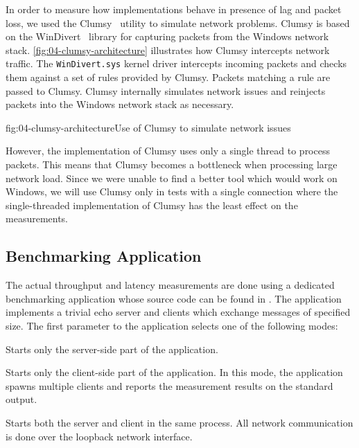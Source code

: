 In order to measure how implementations behave in presence of lag and packet loss, we used the
Clumsy~\cite{clumsy} utility to simulate network problems. Clumsy is based on the
WinDivert~\cite{WinDivert} library for capturing packets from the Windows network stack.
\autoref{fig:04-clumsy-architecture} illustrates how Clumsy intercepts network traffic. The
\texttt{WinDivert.sys} kernel driver intercepts incoming packets and checks them against a set of
rules provided by Clumsy. Packets matching a rule are passed to Clumsy. Clumsy internally simulates
network issues and reinjects packets into the Windows network stack as necessary.

\begin{myFigure}{fig:04-clumsy-architecture}{Use of Clumsy to simulate network issues}

  \resizebox{0.8\linewidth}{!}{}

\end{myFigure}

However, the implementation of Clumsy uses only a single thread to process packets. This means that
Clumsy becomes a bottleneck when processing large network load.  Since we were unable to find a
better tool which would work on Windows, we will use Clumsy only in tests with a single connection
where the single-threaded implementation of Clumsy has the least effect on the measurements.

\subsection{Benchmarking Application}\label{sec:04-benchmark-app}

The actual throughput and latency measurements are done using a dedicated benchmarking \dotnet{}
application whose source code can be found in . The application implements
a trivial echo server and clients which exchange messages of specified size. The first parameter
to the application selects one of the following modes:

\begin{description}

   Starts only the server-side part of the application.

   Starts only the client-side part of the application. In this mode, the
application spawns multiple clients and reports the measurement results on the standard output.

   Starts both the server and client in the same process. All network
communication is done over the loopback network interface.

\end{description}

